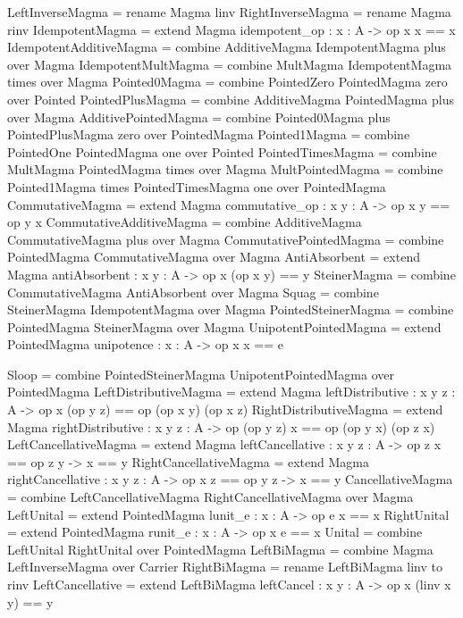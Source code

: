 \begin{togcode} 
LeftInverseMagma = rename Magma linv
RightInverseMagma = rename Magma rinv 
IdempotentMagma = extend Magma {idempotent_op : {x : A} -> op x x == x} 
IdempotentAdditiveMagma =
  combine AdditiveMagma {} IdempotentMagma plus over Magma 
IdempotentMultMagma =
  combine MultMagma {} IdempotentMagma times over Magma 
Pointed0Magma = combine PointedZero {} PointedMagma zero over Pointed
PointedPlusMagma = combine AdditiveMagma {} PointedMagma plus over Magma
AdditivePointedMagma = 
  combine Pointed0Magma plus PointedPlusMagma zero over PointedMagma
Pointed1Magma = combine PointedOne {} PointedMagma one over Pointed
PointedTimesMagma = combine MultMagma {} PointedMagma times over Magma
MultPointedMagma = 
  combine Pointed1Magma times PointedTimesMagma one over PointedMagma
CommutativeMagma = 
  extend Magma {commutative_op : {x y : A} -> op x y == op y x}
CommutativeAdditiveMagma = 
  combine AdditiveMagma {} CommutativeMagma plus over Magma
CommutativePointedMagma = 
  combine PointedMagma {} CommutativeMagma {} over Magma
AntiAbsorbent = 
  extend Magma {antiAbsorbent : {x y : A} -> op x (op x y) == y}
SteinerMagma = combine CommutativeMagma {} AntiAbsorbent {} over Magma 
Squag = combine SteinerMagma {} IdempotentMagma {} over Magma
PointedSteinerMagma = combine PointedMagma {} SteinerMagma {} over Magma
UnipotentPointedMagma = 
  extend PointedMagma {unipotence : {x : A} -> op x x == e}
\end{togcode}  

\begin{togcode} 
Sloop = 
  combine PointedSteinerMagma {} UnipotentPointedMagma {} 
  over PointedMagma 
LeftDistributiveMagma  = 
  extend Magma 
     {leftDistributive : {x y z : A} -> 
          op x (op y z) == op (op x y) (op x z)}
RightDistributiveMagma = 
  extend Magma 
     {rightDistributive : {x y z : A} -> 
           op (op y z) x == op (op y x) (op z x)}
LeftCancellativeMagma  = 
  extend Magma 
     {leftCancellative : {x y z : A} -> op z x == op z y -> x == y }
RightCancellativeMagma = 
  extend Magma 
     {rightCancellative : {x y z : A} -> op x z == op y z -> x == y }
CancellativeMagma = 
  combine LeftCancellativeMagma {} RightCancellativeMagma {} 
  over Magma 
LeftUnital  = extend PointedMagma {lunit_e : {x : A} -> op e x == x}
RightUnital = extend PointedMagma {runit_e : {x : A} -> op x e == x}
Unital = combine LeftUnital {} RightUnital {} over PointedMagma
LeftBiMagma = combine Magma {} LeftInverseMagma {} over Carrier 
RightBiMagma = rename LeftBiMagma {linv to rinv}  
LeftCancellative = 
  extend LeftBiMagma {leftCancel : {x y : A} -> op x (linv x y) == y}  
\end{togcode}  

